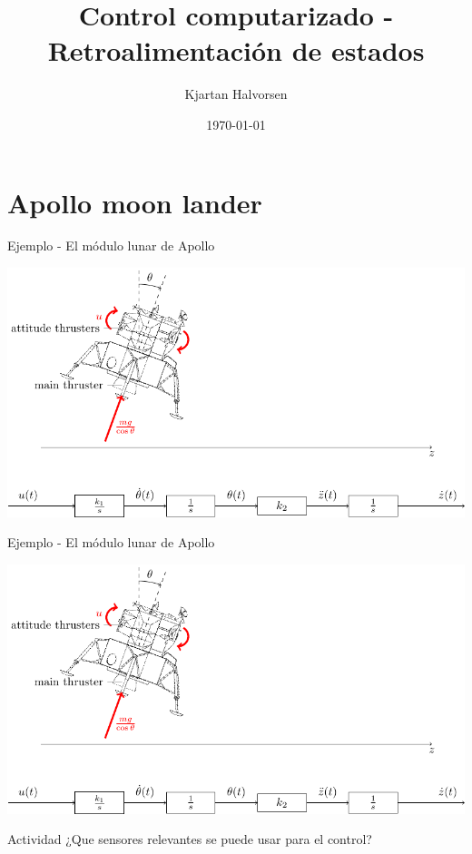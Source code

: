\documentclass[presentation,aspectratio=1610]{beamer}
\author{Kjartan Halvorsen}
\date{\today}
\title{Control computarizado - Retroalimentación de estados}
\begin{document}
\maketitle

\section{Apollo moon lander}
\label{sec:org2a8664b}
\begin{frame}[label={sec:orgee76354}]{Ejemplo - El módulo lunar de Apollo}
\begin{center}
\includegraphics[width=\linewidth]{fig-apollo}
\end{center}
\end{frame}
\begin{frame}[label={sec:orgaf77d3e}]{Ejemplo - El módulo lunar de Apollo}
\begin{center}
\includegraphics[width=0.8\linewidth]{fig-apollo}
\end{center}
\alert{Actividad} ¿Que sensores relevantes se puede usar para el control?
\end{frame}
\end{document}
